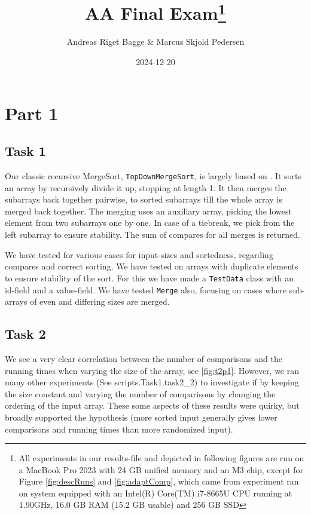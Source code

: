 \documentclass[11pt, a4paper]{article}
\title{AA Final Exam\footnote{All experiments in our results-file and depicted in following figures are run on a MacBook Pro 2023 with 24 GB unified memory and an M3 chip, except for Figure \ref{fig:descRuns} and \ref{fig:adaptComp}, which came from experiment ran on system equipped with an Intel(R) Core(TM) i7-8665U CPU running at 1.90GHz, 16.0 GB RAM (15.2 GB usable) and 256 GB SSD}}
\author{Andreas Riget Bagge \& Marcus Skjold Pedersen}
\date{2024-12-20}
\begin{document}
\maketitle


\section{Part 1}

\subsection{Task 1}
Our classic recursive MergeSort, \verb|TopDownMergeSort|, is largely based on \cite{Sedgewick_Wayne_2011}. It sorts an array by recursively divide it up, stopping at length 1. It then merges the subarrays back together pairwise, to sorted subarrays till the whole array is merged back together. The merging uses an auxiliary array, picking the lowest element from two subarrays one by one. In case of a tiebreak, we pick from the left subarray to ensure stability. The sum of compares for all merges is returned.

 We have tested for various cases for input-sizes and sortedness, regarding compares and correct sorting. We have tested on arrays with duplicate elements to ensure stability of the sort. For this we have made a \verb|TestData| class with an id-field and a value-field. We have tested \verb|Merge| also, focusing on cases where sub-arrays of even and differing sizes are merged.

\subsection{Task 2}

We see a very clear correlation between the number of comparisons and the  running times when varying the size of the array, see \ref{fig:t2p1}.
However, we ran many other experiments (See scripts.Task1.task2\_2) to investigate if by keeping the size constant and varying the number of comparisons by changing the ordering of the input array. These some aspects of these results were quirky, but broadly supported the hypothesis (more sorted input generally gives lower comparisons and running times than more randomized input).
\end{document}
